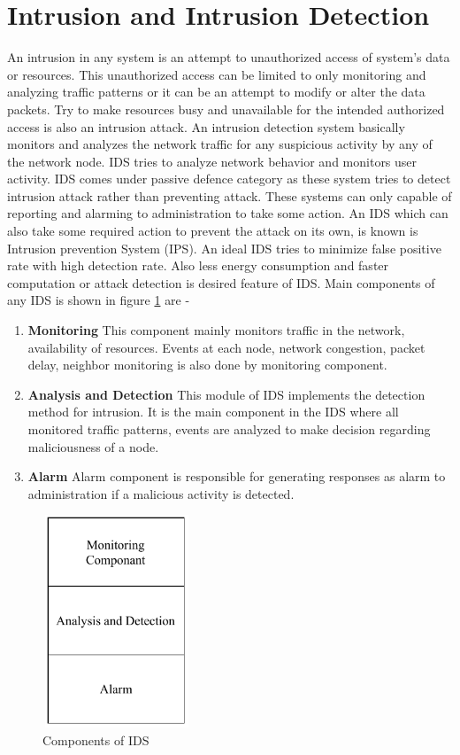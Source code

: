\section{Intrusion and Intrusion Detection}
An intrusion in any system is an attempt to unauthorized access of system's data or resources. This unauthorized access can be limited to only monitoring and analyzing traffic patterns or it can be an attempt to modify or alter the data packets. Try to make resources busy and unavailable for the intended authorized access is also an intrusion attack. An intrusion detection system basically monitors and analyzes the network traffic for any suspicious activity by any of the network node. IDS tries to analyze network behavior and monitors user activity. IDS comes under passive defence category as these system tries to detect intrusion attack rather than preventing attack. These systems can only capable of reporting and alarming to administration to take some action. An IDS which can also take some required action to prevent the attack on its own, is known is Intrusion prevention System (IPS). An ideal IDS tries to minimize false positive rate with high detection rate. Also less energy consumption and faster computation or attack detection is desired feature of IDS. Main components of any IDS is shown in figure \ref{IDS-Component} \cite{alrajeh2013intrusion} are -
\begin{enumerate}[label=\textbf{\roman*}]
\item \textbf{Monitoring} This component mainly monitors traffic in the network, availability of resources. Events at each node, network congestion, packet delay, neighbor monitoring is also done by monitoring component.
\item \textbf{Analysis and Detection} This module of IDS implements the detection method for intrusion. It is the main component in the IDS where all monitored traffic patterns, events are analyzed to make decision regarding maliciousness of a node.
\item \textbf{Alarm} Alarm component is responsible for generating responses as alarm to administration if a malicious activity is detected.
\end{enumerate}
\begin{figure}[tp]
\center	
\includegraphics[width=1.75in, height=2.5in] {Figures/PDF/IDS-Components.pdf}
\caption{Components of IDS}
\label{IDS-Component}	
\end{figure}
\par
